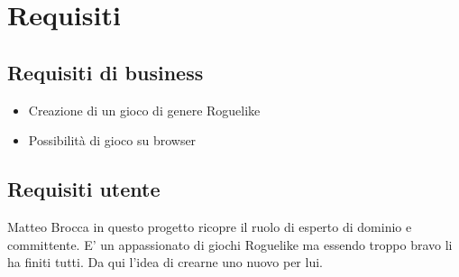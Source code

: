 \section{Requisiti}

\subsection{Requisiti di business}
\begin{itemize}
    \item Creazione di un gioco di genere Roguelike
    \item Possibilità di gioco su browser
\end{itemize}

\subsection{Requisiti utente}

Matteo Brocca in questo progetto ricopre il ruolo di esperto di dominio e committente. 
E' un appassionato di giochi Roguelike ma essendo troppo bravo li ha finiti tutti. 
Da qui l'idea di crearne uno nuovo per lui. 

